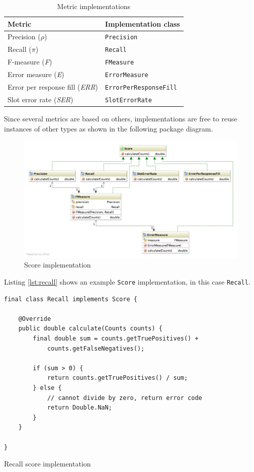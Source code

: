 \begin{table}[H]
\centering
\begin{tabular*}{\textwidth}{ll}
	\toprule
	Metric & Implementation class \\
	\midrule
	Precision ($\rho$) & \texttt{Precision} \\
	Recall ($\pi$) &  \texttt{Recall} \\
	F-measure (\textit{F}) & \texttt{FMeasure} \\
	Error measure (\textit{E}) & \texttt{ErrorMeasure} \\
	Error per response fill (\textit{ERR}) & \texttt{ErrorPerResponseFill} \\
	Slot error rate (\textit{SER}) & \texttt{SlotErrorRate} \\
	\bottomrule
\end{tabular*}
\caption{Metric implementations}
\end{table}

Since several metrics are based on others, implementations are free to reuse instances of other types as shown in the following package diagram.

\begin{figure}[H]
\centering
\includegraphics[width=\textwidth, trim=20px 20px 0 0, clip=true]{score.png}
\caption{Score implementation}
\end{figure}

Listing \ref{lst:recall} shows an example \texttt{Score} implementation, in this case \texttt{Recall}.

\begin{listing}[H]
\begin{verbatim}
final class Recall implements Score {

    @Override
    public double calculate(Counts counts) {
        final double sum = counts.getTruePositives() + 
            counts.getFalseNegatives();

        if (sum > 0) {
            return counts.getTruePositives() / sum;
        } else {
            // cannot divide by zero, return error code
            return Double.NaN;
        }
    }

}
\end{verbatim}
\caption{Recall score implementation}
\label{lst:recall}
\end{listing}

